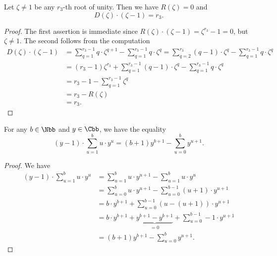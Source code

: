 \begin{lemma}\label{RD}
Let $\zeta\neq 1$ be any $r_3$-th root of unity. Then we have $R(\zeta)=0$ and $$D(\zeta)\cdot(\zeta-1)=r_3.$$
\end{lemma}
\begin{proof}
The first assertion is immediate since $R(\zeta)\cdot(\zeta-1)=\zeta^{r_3}-1=0$, but $\zeta\neq 1$. The second follows from the computation
\begin{equation*}
\begin{split}
D(\zeta)\cdot(\zeta-1)&=\sum_{q=1}^{r_3-1} q\cdot \zeta^{q+1}-\sum_{q=1}^{r_3-1} q\cdot \zeta^q=\sum_{q=2}^{r_3} (q-1)\cdot \zeta^{q}-\sum_{q=1}^{r_3-1} q\cdot \zeta^q\\
&=(r_3-1)\zeta^{r_3}+\sum_{q=1}^{r_3-1} (q-1)\cdot \zeta^{q}-\sum_{q=1}^{r_3-1} q\cdot \zeta^q\\
&=r_3-1-\sum_{q=1}^{r_3-1} \zeta^{q}\\
&=r_3- R(\zeta)\\
&=r_3.
\end{split}
\end{equation*}
\end{proof}

\begin{lemma}\label{argeo}
For any $b\in\Nbb$ and $y\in\Cbb$, we have the equality
$$(y-1)\cdot\sum_{u=1}^{b}u\cdot y^u=(b+1)y^{b+1}-\sum_{u=0}^b y^{u+1}.$$
\end{lemma}
\begin{proof}
We have 
\begin{align*}
(y-1)\cdot\sum_{u=1}^{b}u\cdot y^u&=\sum_{u=1}^{b}u\cdot y^{u+1}-\sum_{u=1}^{b}u\cdot y^u\\
&=\sum_{u=0}^{b}u\cdot y^{u+1}-\sum_{u=0}^{b-1}(u+1)\cdot y^{u+1}\\
&=b\cdot y^{b+1}+\sum_{u=0}^{b-1}(u-(u+1))\cdot y^{u+1}\\
&=b\cdot y^{b+1}+\underbrace{y^{b+1}-y^{b+1}}_{=0}+\sum_{u=0}^{b-1}-1\cdot y^{u+1}\\
&=(b+1)y^{b+1}-\sum_{u=0}^b y^{u+1}.
\end{align*}
\end{proof}

